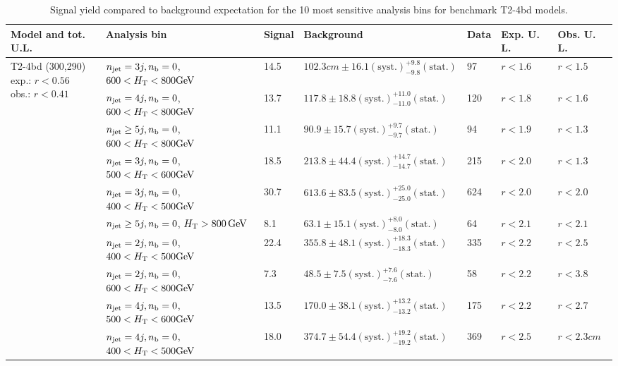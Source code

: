 \begin{table}[h!] 
  \scriptsize
  \caption{ 
Signal yield compared to background expectation for the 10 most sensitive analysis bins 
for benchmark T2-4bd models.
  \label{tab:sigBenchmarksYields_T2-4bd}}
  \centering 
  \begin{tabular}{ lllllll } 
    \hline 
    \hline 
    Model and tot. U.L. & Analysis bin & Signal & Background & Data & Exp. U. L. & Obs. U. L. \\ \hline
\multirow{10}{*}{\parbox[t]{2.3cm}{T2-4bd (300,290)\\exp.: $r<0.56$\\obs.: $r<0.41$}}
 & $n_{\mathrm{jet}} =3j,n_{\text{b}} =0$, $600 < \mbox{$H_\text{T}$} < 800 \mathrm{GeV}$ & 14.5 & $102.3cm \pm 16.1 \mathrm{(syst.)} ^{+9.8}_{-9.8} \mathrm{(stat.)}$ & 97 & $r < 1.6$ & $r < 1.5$\\ 
 & $n_{\mathrm{jet}} =4j,n_{\text{b}} =0$, $600 < \mbox{$H_\text{T}$} < 800 \mathrm{GeV}$ & 13.7 & $117.8 \pm 18.8 \mathrm{(syst.)} ^{+11.0}_{-11.0} \mathrm{(stat.)}$ & 120 & $r < 1.8$ & $r < 1.6$\\ 
 & $n_{\mathrm{jet}} \geq5j,n_{\text{b}} =0$, $600 < \mbox{$H_\text{T}$} < 800 \mathrm{GeV}$ & 11.1 & $90.9 \pm 15.7 \mathrm{(syst.)} ^{+9.7}_{-9.7} \mathrm{(stat.)}$ & 94 & $r < 1.9$ & $r < 1.3$\\ 
 & $n_{\mathrm{jet}} =3j,n_{\text{b}} =0$, $500 < \mbox{$H_\text{T}$} < 600 \mathrm{GeV}$ & 18.5 & $213.8 \pm 44.4 \mathrm{(syst.)} ^{+14.7}_{-14.7} \mathrm{(stat.)}$ & 215 & $r < 2.0$ & $r < 1.3$\\ 
 & $n_{\mathrm{jet}} =3j,n_{\text{b}} =0$, $400 < \mbox{$H_\text{T}$} < 500 \mathrm{GeV}$ & 30.7 & $613.6 \pm 83.5 \mathrm{(syst.)} ^{+25.0}_{-25.0} \mathrm{(stat.)}$ & 624 & $r < 2.0$ & $r < 2.0$\\ 
 & $n_{\mathrm{jet}} \geq5j,n_{\text{b}} =0$, $\mbox{$H_\text{T}$} > 800 \, \mathrm{GeV}$ & 8.1 & $63.1 \pm 15.1 \mathrm{(syst.)} ^{+8.0}_{-8.0} \mathrm{(stat.)}$ & 64 & $r < 2.1$ & $r < 2.1$\\ 
 & $n_{\mathrm{jet}} =2j,n_{\text{b}} =0$, $400 < \mbox{$H_\text{T}$} < 500 \mathrm{GeV}$ & 22.4 & $355.8 \pm 48.1 \mathrm{(syst.)} ^{+18.3}_{-18.3} \mathrm{(stat.)}$ & 335 & $r < 2.2$ & $r < 2.5$\\ 
 & $n_{\mathrm{jet}} =2j,n_{\text{b}} =0$, $600 < \mbox{$H_\text{T}$} < 800 \mathrm{GeV}$ & 7.3 & $48.5 \pm 7.5 \mathrm{(syst.)} ^{+7.6}_{-7.6} \mathrm{(stat.)}$ & 58 & $r < 2.2$ & $r < 3.8$\\ 
 & $n_{\mathrm{jet}} =4j,n_{\text{b}} =0$, $500 < \mbox{$H_\text{T}$} < 600 \mathrm{GeV}$ & 13.5 & $170.0 \pm 38.1 \mathrm{(syst.)} ^{+13.2}_{-13.2} \mathrm{(stat.)}$ & 175 & $r < 2.2$ & $r < 2.7$\\ 
 & $n_{\mathrm{jet}} =4j,n_{\text{b}} =0$, $400 < \mbox{$H_\text{T}$} < 500 \mathrm{GeV}$ & 18.0 & $374.7 \pm 54.4 \mathrm{(syst.)} ^{+19.2}_{-19.2} \mathrm{(stat.)}$ & 369 & $r < 2.5$ & $r < 2.3cm$\\ \hline
    \hline
  \end{tabular}
\end{table}

